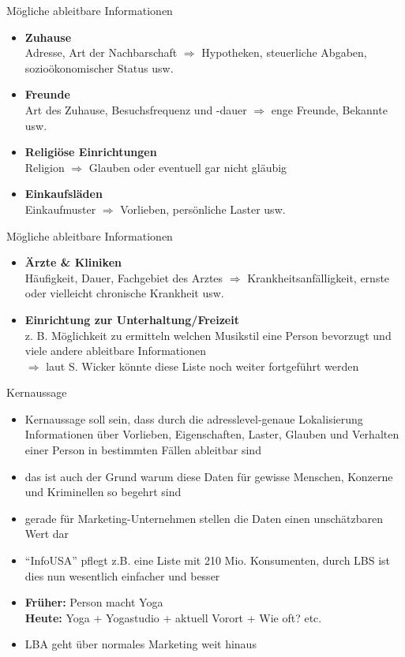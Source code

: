 \begin{frame}{Mögliche ableitbare Informationen}
  \begin{itemize}
  \item \textbf{Zuhause}\\
  Adresse, Art der Nachbarschaft $\Rightarrow$ Hypotheken, steuerliche Abgaben, sozioökonomischer Status usw.
  \item \textbf{Freunde}\\
  Art des Zuhause, Besuchsfrequenz und -dauer $\Rightarrow$ enge Freunde, Bekannte usw.
  \item \textbf{Religiöse Einrichtungen}\\
  Religion $\Rightarrow$ Glauben oder eventuell gar nicht gläubig
  \item \textbf{Einkaufsläden}\\
  Einkaufmuster $\Rightarrow$ Vorlieben, persönliche Laster usw.
  \end{itemize}
\end{frame}

\begin{frame}{Mögliche ableitbare Informationen}
  \begin{itemize}
  \item \textbf{Ärzte \& Kliniken}\\
  Häufigkeit, Dauer, Fachgebiet des Arztes $\Rightarrow$ Krankheitsanfälligkeit, ernste oder
  vielleicht chronische Krankheit usw.
  \item \textbf{Einrichtung zur Unterhaltung/Freizeit}\\
  z. B. Möglichkeit zu ermitteln welchen Musikstil eine Person bevorzugt und viele andere ableitbare Informationen \\ \vspace{.2cm}
  \hspace{-.5cm} $\Rightarrow$ laut S. Wicker könnte diese Liste noch weiter fortgeführt werden
  \end{itemize}
\end{frame}

\begin{frame}{Kernaussage}
  \begin{itemize}
  \item Kernaussage soll sein, dass durch die adresslevel-genaue Lokalisierung Informationen über Vorlieben,
  Eigenschaften, Laster, Glauben und Verhalten einer Person in bestimmten Fällen ableitbar sind
  \item das ist auch der Grund warum diese Daten für gewisse Menschen, Konzerne und Kriminellen so begehrt sind
  \item gerade für Marketing-Unternehmen stellen die Daten einen unschätzbaren Wert dar
  \item "`InfoUSA"' pflegt z.B. eine Liste mit 210 Mio. Konsumenten, durch LBS ist dies nun wesentlich einfacher und besser 
  \item \textbf{Früher:} Person macht Yoga\\
  \textbf{Heute:} Yoga + Yogastudio + aktuell Vorort + Wie oft? etc.
  \item LBA geht über normales Marketing weit hinaus
  \end{itemize}
\end{frame}

